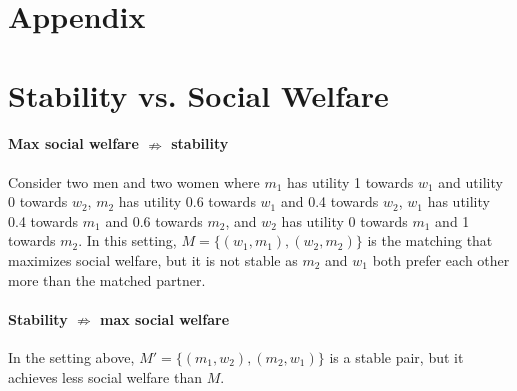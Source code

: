 \newpage
\section*{Appendix}
\setcounter{section}{0}
\setcounter{figure}{0}
\makeatletter 
\renewcommand{\thefigure}{A\@arabic\c@figure}
\makeatother
\setcounter{table}{0}
\renewcommand{\thetable}{A\arabic{table}}
\appendix

\section{Stability vs. Social Welfare}
\paragraph{Max social welfare $\nRightarrow$ stability} Consider two men and two women where $m_1$ has utility 1 towards $w_1$ and utility 0 towards $w_2$, $m_2$ has utility 0.6 towards $w_1$ and 0.4 towards $w_2$, $w_1$ has utility 0.4 towards $m_1$ and 0.6 towards $m_2$, and $w_2$ has utility 0 towards $m_1$ and 1 towards $m_2$. In this setting, $M = \{(w_1, m_1), (w_2, m_2)\}$ is the matching that maximizes social welfare, but it is not stable as $m_2$ and $w_1$ both prefer each other more than the matched partner.

\paragraph{Stability $\nRightarrow$ max social welfare} In the setting above, $M' = \{(m_1, w_2), (m_2, w_1)\}$ is a stable pair, but it achieves less social welfare than $M$.
